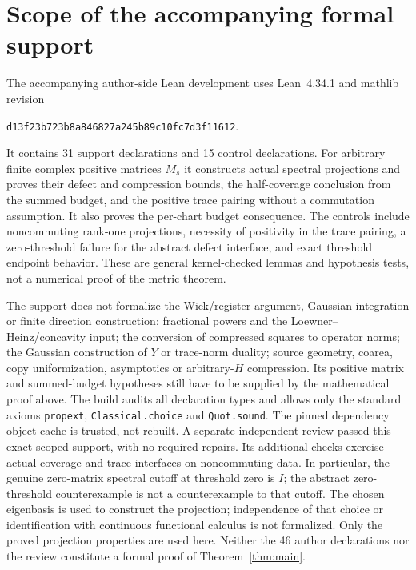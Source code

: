 \documentclass[11pt]{article}
\theoremstyle{remark}\newtheorem{remark}[theorem]{Remark}
\numberwithin{equation}{section}
\begin{document}
\section{Scope of the accompanying formal support}\label{sec:formal}
The accompanying author-side Lean development uses Lean~4.34.1 and
mathlib revision
\begin{center}\small\texttt{d13f23b723b8a846827a245b89c10fc7d3f11612}.\end{center}
It contains 31 support declarations and 15 control declarations. For
arbitrary finite complex positive matrices $M_s$ it constructs actual
spectral projections and proves their defect and compression bounds,
the half-coverage conclusion from the summed budget, and the positive
trace pairing without a commutation assumption. It also proves the
per-chart budget consequence. The controls include noncommuting
rank-one projections, necessity of positivity in the trace pairing,
a zero-threshold failure for the abstract defect interface, and exact
threshold endpoint behavior. These are general kernel-checked lemmas
and hypothesis tests, not a numerical proof of the metric theorem.

The support does not formalize the Wick/register argument, Gaussian
integration or finite direction construction; fractional powers and the
Loewner--Heinz/concavity input; the conversion of compressed squares to
operator norms; the Gaussian construction of $Y$ or trace-norm duality;
source geometry, coarea, copy uniformization, asymptotics or arbitrary-$H$
compression. Its positive matrix and summed-budget hypotheses still
have to be supplied by the mathematical proof above. The build audits
all declaration types and allows only the standard axioms
\texttt{propext}, \texttt{Classical.choice} and \texttt{Quot.sound}.
The pinned dependency object cache is trusted, not rebuilt. A separate
independent review passed this exact scoped support, with no required
repairs. Its additional checks exercise actual coverage and trace
interfaces on noncommuting data. In particular, the genuine zero-matrix
spectral cutoff at threshold zero is $I$; the abstract zero-threshold
counterexample is not a counterexample to that cutoff. The chosen
eigenbasis is used to construct the projection; independence of that
choice or identification with continuous functional calculus is not
formalized. Only the proved projection properties are used here. Neither
the 46 author declarations nor the review constitute a formal proof of
Theorem~\ref{thm:main}.
\end{document}
